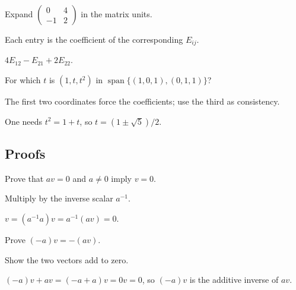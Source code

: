 \begin{exercise}\label{exr:i01-expand-04}
Expand \(\begin{pmatrix}0&4\\-1&2\end{pmatrix}\) in the matrix units.
\end{exercise}
\begin{hint}
Each entry is the coefficient of the corresponding \(E_{ij}\).
\end{hint}
\begin{solution}
\(4E_{12}-E_{21}+2E_{22}\).
\end{solution}

\begin{exercise}\label{exr:i01-expand-05}
For which \(t\) is \((1,t,t^2)\) in \(\operatorname{span}\{(1,0,1),(0,1,1)\}\)?
\end{exercise}
\begin{hint}
The first two coordinates force the coefficients; use the third as consistency.
\end{hint}
\begin{solution}
One needs \(t^2=1+t\), so \(t=(1\pm\sqrt5)/2\).
\end{solution}

\subsection*{Proofs}

\begin{exercise}\label{exr:i01-expand-06}
Prove that \(av=0\) and \(a\neq0\) imply \(v=0\).
\end{exercise}
\begin{hint}
Multiply by the inverse scalar \(a^{-1}\).
\end{hint}
\begin{solution}
\(v=(a^{-1}a)v=a^{-1}(av)=0\).
\end{solution}

\begin{exercise}\label{exr:i01-expand-07}
Prove \((-a)v=-(av)\).
\end{exercise}
\begin{hint}
Show the two vectors add to zero.
\end{hint}
\begin{solution}
\((-a)v+av=(-a+a)v=0v=0\), so \((-a)v\) is the additive inverse of \(av\).
\end{solution}

